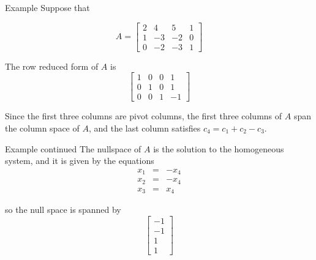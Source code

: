 \documentclass[
  ignorenonframetext,
]{beamer}
\begin{document}
\begin{frame}{Example}
\label{example}
Suppose that

\[
A=\left[\begin{matrix} 2 & 4 & 5& 1\\ 1 & -3 & -2& 0\\ 0 & -2 & -3 & 1\end{matrix}\right]
\]

The row reduced form of \(A\) is \[
\left[\begin{matrix}1 & 0 & 0 & 1 \\ 0 & 1 & 0 & 1\\0 & 0 & 1 & -1\end{matrix}\right]
\]

Since the first three columns are pivot columns, the first three columns
of \(A\) span the column space of \(A\), and the last column satisfies
\(c_4 = c_1+c_2-c_3\).
\end{frame}

\begin{frame}{Example continued}
\label{example-continued}
The nullspace of \(A\) is the solution to the homogeneous system, and it
is given by the equations \[\begin{array}{ccc}
x_1 &=&-x_4 \\
x_2 &=& -x_4 \\
x_3 &=& x_4
\end{array}
\]

so the null space is spanned by \[
\left[\begin{matrix} -1 \\ -1 \\ 1 \\ 1\end{matrix}\right]
\]
\end{frame}
\end{document}
